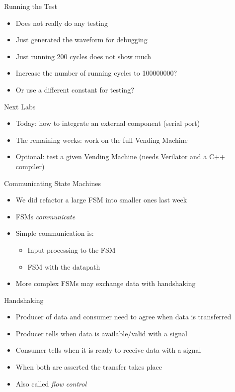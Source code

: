 \begin{frame}[fragile]{Running the Test}
\begin{itemize}
\item Does not really do any testing
\item Just generated the waveform for debugging
\item Just running 200 cycles does not show much
\item Increase the number of running cycles to 100000000?
\item Or use a different constant for testing?
\end{itemize}
\end{frame}





\begin{frame}[fragile]{Next Labs}
\begin{itemize}
\item Today: how to integrate an external component (serial port)
\item The remaining weeks: work on the full Vending Machine
\item Optional: test a given Vending Machine (needs Verilator and a C++ compiler)
\end{itemize}
\end{frame}



\begin{frame}[fragile]{Communicating State Machines}
\begin{itemize}
\item We did refactor a large FSM into smaller ones last week
\item FSMs \emph{communicate}
\item Simple communication is:
\begin{itemize}
\item Input processing to the FSM
\item FSM with the datapath
\end{itemize}
\item More complex FSMs may exchange data with handshaking
\end{itemize}
\end{frame}

\begin{frame}[fragile]{Handshaking}
\begin{itemize}
\item Producer of data and consumer need to agree when data is transferred
\item Producer tells when data is available/valid with a  signal
\item Consumer tells when it is ready to receive data with a  signal
\item When both are asserted the transfer takes place
\item Also called \emph{flow control}
\end{itemize}
\end{frame}

